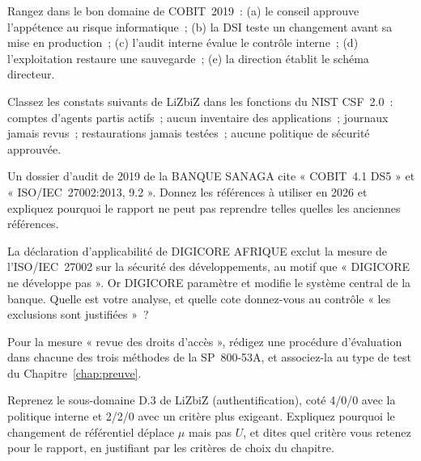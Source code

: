 \bigskip

\begin{boxexo}[title={\ding{45}\quad Exercice~14.4. Gouvernance ou gestion~? \niveaubase}]
Rangez dans le bon domaine de COBIT~2019~: (a) le conseil approuve
l'appétence au risque informatique~; (b) la DSI teste un changement avant
sa mise en production~; (c) l'audit interne évalue le contrôle interne~;
(d) l'exploitation restaure une sauvegarde~; (e) la direction établit le
schéma directeur.
\end{boxexo}

\begin{boxexo}[title={\ding{45}\quad Exercice~14.5. Les fonctions du CSF \niveaubase}]
Classez les constats suivants de LiZbiZ dans les fonctions du NIST
CSF~2.0~: comptes d'agents partis actifs~; aucun inventaire des
applications~; journaux jamais revus~; restaurations jamais testées~;
aucune politique de sécurité approuvée.
\end{boxexo}

\begin{boxexo}[title={\ding{45}\quad Exercice~14.6. Convertir une ancienne grille \niveaumoyen}]
Un dossier d'audit de 2019 de la BANQUE SANAGA cite « COBIT~4.1 DS5 » et
« ISO/IEC~27002:2013, 9.2 ». Donnez les références à utiliser en 2026 et
expliquez pourquoi le rapport ne peut pas reprendre telles quelles les
anciennes références.
\end{boxexo}

\begin{boxexo}[title={\ding{45}\quad Exercice~14.7. La déclaration d'applicabilité \niveaumoyen}]
La déclaration d'applicabilité de DIGICORE AFRIQUE exclut la mesure de
l'ISO/IEC~27002 sur la sécurité des développements, au motif que
« DIGICORE ne développe pas ». Or DIGICORE paramètre et modifie le système
central de la banque. Quelle est votre analyse, et quelle cote donnez-vous
au contrôle « les exclusions sont justifiées »~?
\end{boxexo}

\begin{boxexo}[title={\ding{45}\quad Exercice~14.8. Examiner, interroger, tester \niveaumoyen}]
Pour la mesure « revue des droits d'accès », rédigez une procédure
d'évaluation dans chacune des trois méthodes de la SP~800-53A, et
associez-la au type de test du Chapitre~\ref{chap:preuve}.
\end{boxexo}

\begin{boxexo}[title={\ding{45}\quad Exercice~14.9. Le référentiel déplace µ \niveauexpert}]
Reprenez le sous-domaine D.3 de LiZbiZ (authentification), coté 4/0/0
avec la politique interne et 2/2/0 avec un critère plus exigeant.
Expliquez pourquoi le changement de référentiel déplace $\mu$ mais pas
$U$, et dites quel critère vous retenez pour le rapport, en justifiant par
les critères de choix du chapitre.
\end{boxexo}

